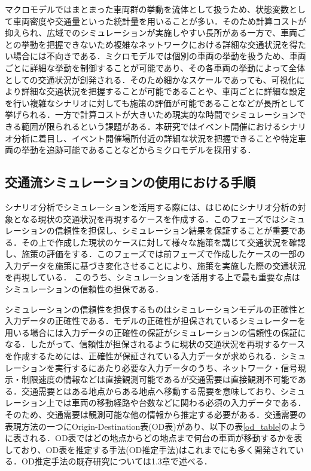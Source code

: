 マクロモデルではまとまった車両群の挙動を流体として扱うため、状態変数として車両密度や交通量といった統計量を用いることが多い．そのため計算コストが抑えられ、広域でのシミュレーションが実施しやすい長所がある一方で、車両ごとの挙動を把握できないため複雑なネットワークにおける詳細な交通状況を得たい場合には不向きである．ミクロモデルでは個別の車両の挙動を扱うため、車両ごとに詳細な挙動を制御することが可能であり、その各車両の挙動によって全体としての交通状況が創発される．そのため細かなスケールであっても、可視化により詳細な交通状況を把握することが可能であることや、車両ごとに詳細な設定を行い複雑なシナリオに対しても施策の評価が可能であることなどが長所として挙げられる．一方で計算コストが大きいため現実的な時間でシミュレーションできる範囲が限られるという課題がある．本研究ではイベント開催におけるシナリオ分析に着目し、イベント開催場所付近の詳細な状況を把握できることや特定車両の挙動を追跡可能であることなどからミクロモデルを採用する．

\subsection{交通流シミュレーションの使用における手順}

シナリオ分析でシミュレーションを活用する際には、はじめにシナリオ分析の対象となる現状の交通状況を再現するケースを作成する．このフェーズではシミュレーションの信頼性を担保し、シミュレーション結果を保証することが重要である．その上で作成した現状のケースに対して様々な施策を講じて交通状況を確認し、施策の評価をする．このフェーズでは前フェーズで作成したケースの一部の入力データを施策に基づき変化させることにより、施策を実施した際の交通状況を再現している．
このうち、シミュレーションを活用する上で最も重要な点はシミュレーションの信頼性の担保である．

シミュレーションの信頼性を担保するものはシミュレーションモデルの正確性と入力データの正確性である．モデルの正確性が担保されているシミュレーターを用いる場合には入力データの正確性の保証がシミュレーションの信頼性の保証になる．したがって、信頼性が担保されるように現状の交通状況を再現するケースを作成するためには、正確性が保証されている入力データが求められる．シミュレーションを実行するにあたり必要な入力データのうち、ネットワーク・信号現示・制限速度の情報などは直接観測可能であるが交通需要は直接観測不可能である．交通需要とはある地点からある地点へ移動する需要を意味しており、シミュレーション上では車両の移動経路や台数などに関わる必須の入力データである．そのため、交通需要は観測可能な他の情報から推定する必要がある．交通需要の表現方法の一つにOrigin-Destination表(OD表)があり、以下の表\ref{od_table}のように表される．OD表ではどの地点からどの地点まで何台の車両が移動するかを表しており、OD表を推定する手法(OD推定手法)はこれまでにも多く開発されている．OD推定手法の既存研究については1.3章で述べる．

